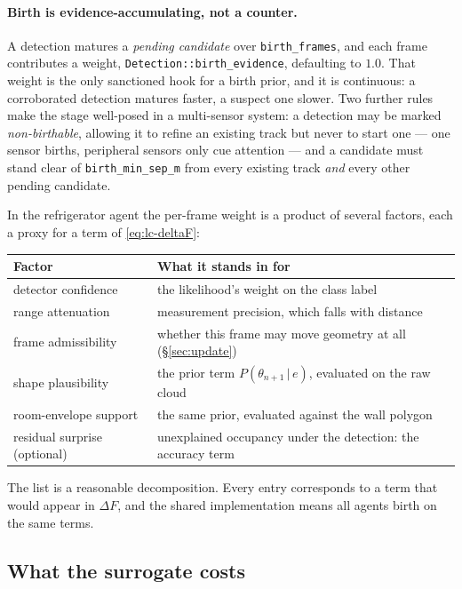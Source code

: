 \documentclass[11pt,a4paper]{report}
\newcommand{\given}{\,|\,}
\begin{document}
\paragraph{Birth is evidence-accumulating, not a counter.} A detection matures a \emph{pending
candidate} over \texttt{birth\_frames}, and each frame contributes a weight,
\texttt{Detection::birth\_evidence}, defaulting to $1.0$. That weight is the only sanctioned hook for
a birth prior, and it is continuous: a corroborated detection matures faster, a suspect one slower.
Two further rules make the stage well-posed in a multi-sensor system: a detection may be marked
\emph{non-birthable}, allowing it to refine an existing track but never to start one --- one sensor
births, peripheral sensors only cue attention --- and a candidate must stand clear of
\texttt{birth\_min\_sep\_m} from every existing track \emph{and} every other pending candidate.

In the refrigerator agent the per-frame weight is a product of several factors, each a proxy for a
term of \eqref{eq:lc-deltaF}:

\begin{center}
\begin{tabular}{@{}l p{9.4cm}@{}}
\toprule
Factor & What it stands in for \\
\midrule
detector confidence & the likelihood's weight on the class label \\
range attenuation   & measurement precision, which falls with distance \\
frame admissibility & whether this frame may move geometry at all (\S\ref{sec:update}) \\
shape plausibility  & the prior term $P(\theta_{n+1}\given e)$, evaluated on the raw cloud \\
room-envelope support & the same prior, evaluated against the wall polygon \\
residual surprise (optional) & unexplained occupancy under the detection: the accuracy term \\
\bottomrule
\end{tabular}
\end{center}

\noindent
The list is a reasonable decomposition. Every entry corresponds to a term that would appear in
$\Delta F$, and the shared implementation means all agents birth on the same terms.

\subsection{What the surrogate costs}
\end{document}
